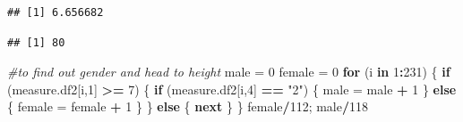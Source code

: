\documentclass[]{article}
\newenvironment{Shaded}{\begin{snugshade}}{\end{snugshade}}
\newcommand{\CommentTok}[1]{\textcolor[rgb]{0.56,0.35,0.01}{\textit{#1}}}
\newcommand{\ControlFlowTok}[1]{\textcolor[rgb]{0.13,0.29,0.53}{\textbf{#1}}}
\newcommand{\DataTypeTok}[1]{\textcolor[rgb]{0.13,0.29,0.53}{#1}}
\newcommand{\DecValTok}[1]{\textcolor[rgb]{0.00,0.00,0.81}{#1}}
\newcommand{\KeywordTok}[1]{\textcolor[rgb]{0.13,0.29,0.53}{\textbf{#1}}}
\newcommand{\NormalTok}[1]{#1}
\newcommand{\OperatorTok}[1]{\textcolor[rgb]{0.81,0.36,0.00}{\textbf{#1}}}
\newcommand{\StringTok}[1]{\textcolor[rgb]{0.31,0.60,0.02}{#1}}
\begin{document}
\begin{verbatim}
## [1] 6.656682
\end{verbatim}

\begin{Shaded}
\end{Shaded}

\begin{verbatim}
## [1] 80
\end{verbatim}

\begin{Shaded}
\begin{Highlighting}[]
\CommentTok{#to find out gender and head to height}
\NormalTok{male =}\StringTok{ }\DecValTok{0}
\NormalTok{female =}\StringTok{ }\DecValTok{0}
\ControlFlowTok{for}\NormalTok{ (i }\ControlFlowTok{in} \DecValTok{1}\OperatorTok{:}\DecValTok{231}\NormalTok{)}
\NormalTok{\{}
  \ControlFlowTok{if}\NormalTok{ (measure.df2[i,}\DecValTok{1}\NormalTok{] }\OperatorTok{>=}\StringTok{ }\DecValTok{7}\NormalTok{)}
\NormalTok{  \{}
    \ControlFlowTok{if}\NormalTok{ (measure.df2[i,}\DecValTok{4}\NormalTok{] }\OperatorTok{==}\StringTok{ "2"}\NormalTok{)}
\NormalTok{    \{}
\NormalTok{      male =}\StringTok{ }\NormalTok{male }\OperatorTok{+}\StringTok{ }\DecValTok{1}
\NormalTok{    \}}
    \ControlFlowTok{else}
\NormalTok{    \{}
\NormalTok{      female =}\StringTok{ }\NormalTok{female }\OperatorTok{+}\StringTok{ }\DecValTok{1}
\NormalTok{    \}}
\NormalTok{  \}}
  \ControlFlowTok{else}
\NormalTok{  \{}
    \ControlFlowTok{next}
\NormalTok{  \}}
\NormalTok{\}}
\NormalTok{female}\OperatorTok{/}\DecValTok{112}\NormalTok{; male}\OperatorTok{/}\DecValTok{118}
\end{Highlighting}
\end{Shaded}
\end{document}

